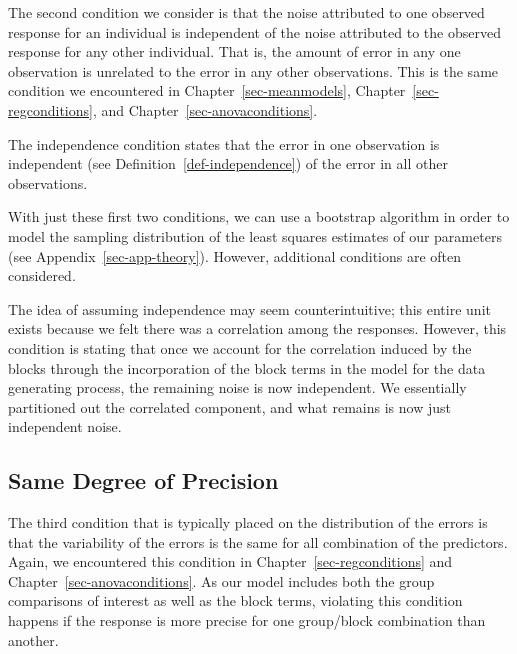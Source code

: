 \documentclass[
  letterpaper,
  DIV=11,
  numbers=noendperiod]{scrreprt}
\theoremstyle{definition}
\theoremstyle{definition}
\theoremstyle{plain}
\theoremstyle{remark}
\begin{document}
The second condition we consider is that the noise attributed to one
observed response for an individual is independent of the noise
attributed to the observed response for any other individual. That is,
the amount of error in any one observation is unrelated to the error in
any other observations. This is the same condition we encountered in
Chapter~\ref{sec-meanmodels}, Chapter~\ref{sec-regconditions}, and
Chapter~\ref{sec-anovaconditions}.

\begin{tcolorbox}[enhanced jigsaw, colbacktitle=quarto-callout-note-color!10!white, colback=white, left=2mm, title=\textcolor{quarto-callout-note-color}{\faInfo}\hspace{0.5em}{Independence Condition}, toptitle=1mm, leftrule=.75mm, breakable, bottomrule=.15mm, arc=.35mm, rightrule=.15mm, toprule=.15mm, coltitle=black, opacityback=0, colframe=quarto-callout-note-color-frame, opacitybacktitle=0.6, bottomtitle=1mm, titlerule=0mm]

The independence condition states that the error in one observation is
independent (see Definition~\ref{def-independence}) of the error in all
other observations.

\end{tcolorbox}

With just these first two conditions, we can use a bootstrap algorithm
in order to model the sampling distribution of the least squares
estimates of our parameters (see Appendix~\ref{sec-app-theory}).
However, additional conditions are often considered.

The idea of assuming independence may seem counterintuitive; this entire
unit exists because we felt there was a correlation among the responses.
However, this condition is stating that once we account for the
correlation induced by the blocks through the incorporation of the block
terms in the model for the data generating process, the remaining noise
is now independent. We essentially partitioned out the correlated
component, and what remains is now just independent noise.

\subsection{Same Degree of Precision}\label{same-degree-of-precision-2}

The third condition that is typically placed on the distribution of the
errors is that the variability of the errors is the same for all
combination of the predictors. Again, we encountered this condition in
Chapter~\ref{sec-regconditions} and Chapter~\ref{sec-anovaconditions}.
As our model includes both the group comparisons of interest as well as
the block terms, violating this condition happens if the response is
more precise for one group/block combination than another.
\end{document}
